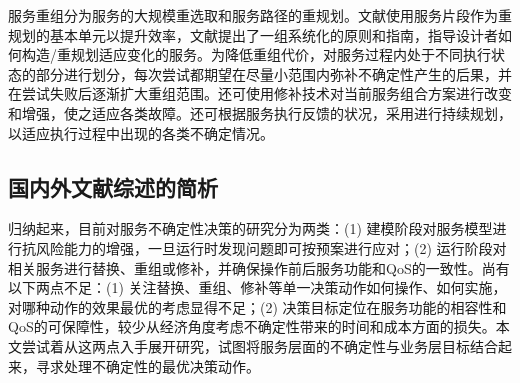 服务重组分为服务的大规模重选取和服务路径的重规划。文献\cite{bouhini2010discovery}使用服务片段作为重规划的基本单元以提升效率，文献\cite{bucchiarone2010design}提出了一组系统化的原则和指南，指导设计者如何构造/重规划适应变化的服务。为降低重组代价，对服务过程内处于不同执行状态的部分进行划分，每次尝试都期望在尽量小范围内弥补不确定性产生的后果，并在尝试失败后逐渐扩大重组范围。还可使用修补技术对当前服务组合方案进行改变和增强，使之适应各类故障。还可根据服务执行反馈的状况，采用进行持续规划，以适应执行过程中出现的各类不确定情况。

\subsection{国内外文献综述的简析}
归纳起来，目前对服务不确定性决策的研究分为两类：(1) 建模阶段对服务模型进行抗风险能力的增强，一旦运行时发现问题即可按预案进行应对；(2) 运行阶段对相关服务进行替换、重组或修补，并确保操作前后服务功能和QoS的一致性。尚有以下两点不足：(1) 关注替换、重组、修补等单一决策动作如何操作、如何实施，对哪种动作的效果最优的考虑显得不足；(2) 决策目标定位在服务功能的相容性和QoS的可保障性，较少从经济角度考虑不确定性带来的时间和成本方面的损失。本文尝试着从这两点入手展开研究，试图将服务层面的不确定性与业务层目标结合起来，寻求处理不确定性的最优决策动作。
